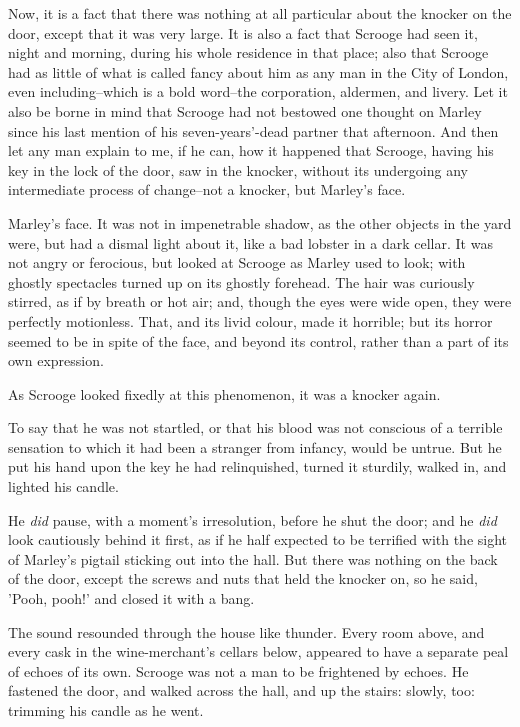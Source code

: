 Now, it is a fact that there was nothing at all particular about the
knocker on the door, except that it was very large. It is also a fact
that Scrooge had seen it, night and morning, during his whole residence
in that place; also that Scrooge had as little of what is called fancy
about him as any man in the City of London, even including--which is a
bold word--the corporation, aldermen, and livery. Let it also be borne
in mind that Scrooge had not bestowed one thought on Marley since his
last mention of his seven-years'-dead partner that afternoon. And then
let any man explain to me, if he can, how it happened that Scrooge,
having his key in the lock of the door, saw in the knocker, without its
undergoing any intermediate process of change--not a knocker, but
Marley's face.

Marley's face. It was not in impenetrable shadow, as the other objects
in the yard were, but had a dismal light about it, like a bad lobster in
a dark cellar. It was not angry or ferocious, but looked at Scrooge as
Marley used to look; with ghostly spectacles turned up on its ghostly
forehead. The hair was curiously stirred, as if by breath or hot air;
and, though the eyes were wide open, they were perfectly motionless.
That, and its livid colour, made it horrible; but its horror seemed to
be in spite of the face, and beyond its control, rather than a part of
its own expression.

As Scrooge looked fixedly at this phenomenon, it was a knocker again.

To say that he was not startled, or that his blood was not conscious of
a terrible sensation to which it had been a stranger from infancy, would
be untrue. But he put his hand upon the key he had relinquished, turned
it sturdily, walked in, and lighted his candle.

He \emph{did} pause, with a moment's irresolution, before he shut the door;
and he \emph{did} look cautiously behind it first, as if he half expected to
be terrified with the sight of Marley's pigtail sticking out into the
hall. But there was nothing on the back of the door, except the screws
and nuts that held the knocker on, so he said, 'Pooh, pooh!' and closed
it with a bang.

The sound resounded through the house like thunder. Every room above,
and every cask in the wine-merchant's cellars below, appeared to have a
separate peal of echoes of its own. Scrooge was not a man to be
frightened by echoes. He fastened the door, and walked across the hall,
and up the stairs: slowly, too: trimming his candle as he went.

